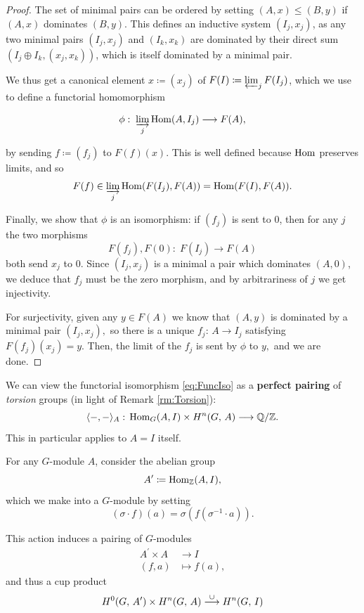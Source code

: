 \documentclass[a4paper, oneside]{memoir}
\begin{document}
\begin{proof}
	The set of minimal pairs can be ordered by setting \((A,x)\leq (B,y)\) if \((A,x)\) dominates \((B,y)\). This defines an inductive system \((I_j,x_j)\), as any two minimal pairs \((I_j,x_j)\) and \((I_k,x_k)\) are dominated by their direct sum \(\left(I_j\oplus I_k,(x_j,x_k)\right)\), which is itself dominated by a minimal pair.

	We thus get a canonical element \(x\coloneqq (x_j)\) of \(F(I)\coloneqq \varprojlim_j F(I_j)\), which we use to define a functorial homomorphism

	\[
		\phi: \; \varinjlim_j \operatorname{Hom}(A,I_j)\longrightarrow F(A),
	\]

	by sending \(f\coloneqq (f_j)\) to \(F(f)(x)\). This is well defined because \(\operatorname{Hom}\) preserves limits, and so
	\[
		F(f)\in\varinjlim_j{\operatorname{Hom}(F(I_j),F(A))}=\operatorname{Hom}(F(I),F(A)).
	\]

	Finally, we show that \(\phi\) is an isomorphism: if \((f_j)\) is sent to \(0\), then for any \(j\) the two morphisms
	\[
		F(f_j), F(0):\; F(I_j) \to F(A)
	\]
	both send \(x_j\) to \(0.\) Since \((I_j,x_j)\) is a minimal a pair which dominates \((A,0)\), we deduce that \(f_j\) must be the zero morphism, and by arbitrariness of \(j\) we get injectivity.

	For surjectivity, given any \(y\in F(A)\) we know that \((A,y)\) is dominated by a minimal pair \((I_j,x_j),\) so there is a unique \(f_j:\, A\to I_j\) satisfying \(F(f_j)(x_j)=y.\) Then, the limit of the \(f_j\) is sent by \(\phi\) to \(y,\) and we are done.
\end{proof}


\begin{remark}
	We can view the functorial isomorphism \eqref{eq:FuncIso} as a \textbf{perfect pairing} of \textit{torsion} groups (in light of Remark \ref{rm:Torsion}):
	\[
		\langle-,-\rangle_A:\,\operatorname{Hom}_G(A,I)\times H^{n}( G, \, A )\longrightarrow\mathbb{Q} /\mathbb{Z}.
	\]
	This in particular applies to $A=I$ itself.
\end{remark}

For any \(G\)-module \(A\), consider the abelian group
\[
	A^{\prime}\coloneqq \operatorname{Hom}_{\mathbb{Z}}(A,I),
\]
which we make into a \(G\)-module by setting
\begin{equation}\label{eq:TateTwist}
	(\sigma\cdot f)(a)=\sigma(f(\sigma^{-1}\cdot a)).
\end{equation}

This action induces a pairing of \(G\)-modules
\begin{align*}
	A^\prime\times A & \to I         \\
	(f,a)            & \mapsto f(a),
\end{align*}
and thus a cup product
\[
	H^{0}( G, \, A^\prime )\times H^{n}( G, \, A )\overset{\cup}{\longrightarrow}H^{n}( G, \, I )
\]
\end{document}

